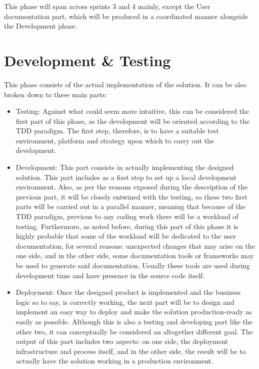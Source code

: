 This phase will span across sprints 3 and 4 mainly, except the User documentation part, which will be produced in a coordinated manner alongside the Development phase.

\section{Development \& Testing}
This phase consists of the actual implementation of the solution. It can be also broken down to three main parts:

\begin{itemize}
\item Testing: Against what could seem more intuitive, this can be considered the first part of this phase, as the development will be oriented according to the TDD paradigm. The first step, therefore, is to have a suitable test environment, platform and strategy upon which to carry out the development.

\item Development: This part consists in actually implementing the designed solution. This part includes as a first step to set up a local development environment. Also, as per the reasons exposed during the description of the previous part, it will be closely entwined with the testing, so these two first parts will be carried out in a parallel manner, meaning that because of the TDD paradigm, previous to any coding work there will be a workload of testing. Furthermore, as noted before, during this part of this phase it is highly probable that some of the workload will be dedicated to the user documentation, for several reasons: unexpected changes that may arise on the one side, and in the other side, some documentation tools or frameworks may be used to generate said documentation. Usually these tools are used during development time and have presence in the source code itself.

\item Deployment: Once the designed product is implemented and the business logic so to say, is correctly working, the next part will be to design and implement an easy way to deploy and make the solution production-ready as easily as possible. Although this is also a testing and developing part like the other two, it can conceptually be considered an altogether different goal. The output of this part includes two aspects: on one side, the deployment infrastructure and process itself, and in the other side, the result will be to actually have the solution working in a production environment.
\end{itemize}

